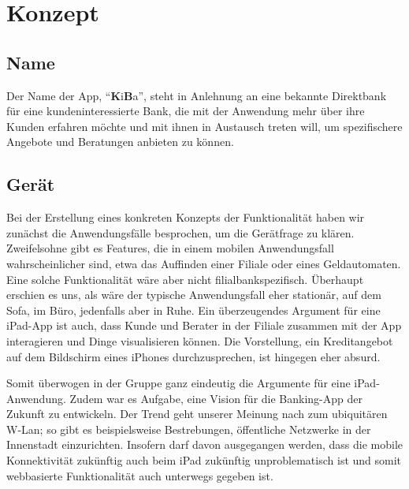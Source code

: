 \documentclass[a4paper, 12pt]{scrartcl}
\begin{document}
    \section{Konzept}
    \subsection{Name}
    Der Name der App, "`\textbf{K}i\textbf{B}a"', steht in Anlehnung an eine bekannte Direktbank für eine kundeninteressierte Bank, die mit der Anwendung mehr über ihre Kunden erfahren möchte und mit ihnen in Austausch treten will, um spezifischere Angebote und Beratungen anbieten zu können.
    
   	\subsection{Gerät}
    Bei der Erstellung eines konkreten Konzepts der Funktionalität haben wir zunächst die Anwendungsfälle besprochen, um die Gerätfrage zu klären. Zweifelsohne gibt es Features, die in einem mobilen Anwendungsfall wahrscheinlicher sind, etwa das Auffinden einer Filiale oder eines Geldautomaten. Eine solche Funktionalität wäre aber nicht filialbankspezifisch. Überhaupt erschien es uns, als wäre der typische Anwendungsfall eher stationär, auf dem Sofa, im Büro, jedenfalls aber in Ruhe. Ein überzeugendes Argument für eine iPad-App ist auch, dass Kunde und Berater in der Filiale zusammen mit der App interagieren und Dinge visualisieren können. Die Vorstellung, ein Kreditangebot auf dem Bildschirm eines iPhones durchzusprechen, ist hingegen eher absurd. 
    
    
    Somit überwogen in der Gruppe ganz eindeutig die Argumente für eine iPad-Anwendung. Zudem war es Aufgabe, eine Vision für die Banking-App der Zukunft zu entwickeln. Der Trend geht unserer Meinung nach zum ubiquitären W-Lan; so gibt es beispielsweise Bestrebungen, öffentliche Netzwerke in der Innenstadt einzurichten. Insofern darf davon ausgegangen werden, dass die mobile Konnektivität zukünftig auch beim iPad zukünftig unproblematisch ist und somit webbasierte Funktionalität auch unterwegs gegeben ist.
    
\end{document}
